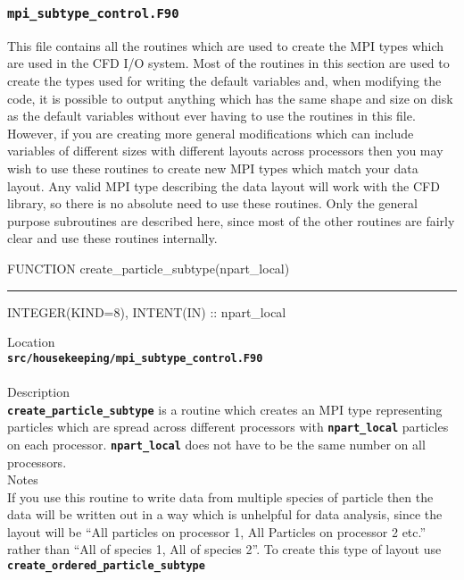 \documentclass[12pt,a4paper]{article}
\newcommand{\HRule}{\rule[0.3cm]{\linewidth}{0.5mm}}
\newcommand{\inlinecode}[1]{{\color{warwickred} \bf\texttt{#1}}}
\begin{document}
\subsubsection{\inlinecode{mpi\_subtype\_control.F90}}
This file contains all the routines which are used to create the MPI types
which are used in the CFD I/O system. Most of the routines in this section are
used to create the types used for writing the default variables and,
when modifying the code, it is possible to output anything which has the same
shape and size on disk as the default variables without ever having to use the
routines in this file. However, if you are creating more general modifications
which can include variables of different sizes with different layouts across
processors then you may wish to use these routines to create new MPI types which
match your data layout. Any valid MPI type describing the data layout will work
with the CFD library, so there is no absolute need to use these routines. Only
the general purpose subroutines are described here, since most of the other
routines are fairly clear and use these routines internally.

\pagebreak
\begin{codedef}
FUNCTION create_particle_subtype(npart_local)
\HRule
INTEGER(KIND=8), INTENT(IN) :: npart_local
\end{codedef}
\vspace{1cm}
{\Large Location\\}
\inlinecode{src/housekeeping/mpi\_subtype\_control.F90}\\
\\[0.5cm]
{\Large Description\\}
\inlinecode{create\_particle\_subtype} is a routine which creates an MPI type
representing particles which are spread across different processors with
\inlinecode{npart\_local} particles on each
processor. \inlinecode{npart\_local} does not have to be the same number on all
processors.
\\[0.5cm]
{\Large Notes\\}
If you use this routine to write data from multiple species of particle then
the data will be written out in a way which is unhelpful for data analysis,
since the layout will be ``All particles on processor 1, All Particles on
processor 2 etc.'' rather than ``All of species 1, All of species 2''. To create
this type of layout use \inlinecode{create\_ordered\_particle\_subtype}
\end{document}
